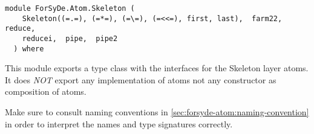 \label{module:ForSyDe.Atom.Skeleton}
\haddockbeginheader
{\haddockverb\begin{verbatim}
module ForSyDe.Atom.Skeleton (
    Skeleton((=.=), (=*=), (=\=), (=<<=), first, last),  farm22,  reduce, 
    reducei,  pipe,  pipe2
  ) where\end{verbatim}}
\haddockendheader

This module exports a type class with the interfaces for the
 Skeleton layer atoms. It does \emph{NOT} export any implementation of
 atoms not any constructor as composition of atoms.\par
\begin{mdframed}[style=reminder,frametitle=Reminder]Make sure to consult naming conventions in  \cref{sec:forsyde-atom:naming-convention} in order to interpret the names and type signatures correctly.\end{mdframed}\par

